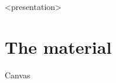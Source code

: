 
\begin{onlyenv}<presentation>
\section{The material}

\begin{frame}[fragile]
  \begin{center}
    \huge
    Canvas
  \end{center}
\end{frame}
\end{onlyenv}



\begin{frame}[allowframebreaks]
\end{frame}

